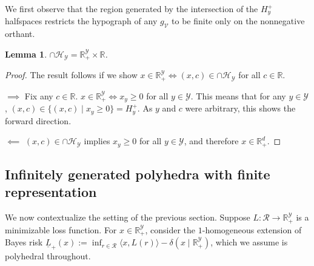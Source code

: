 \documentclass[11pt]{article}
\newcommand{\reals}{\mathbb{R}}
\renewcommand{\H}{\mathcal{H}}
\newcommand{\R}{\mathcal{R}}
\newcommand{\V}{\mathcal{V}}
\newcommand{\Y}{\mathcal{Y}}
\newcommand{\risk}[1]{\underline{#1}}
\newcommand{\inprod}[2]{\langle #1, #2 \rangle}%
\newtheorem{lemma}{Lemma}
\begin{document}
We first observe that the region generated by the intersection of the $H^+_y$ halfspaces restricts the hypograph of any $g_\V$ to be finite only on the nonnegative orthant.
\begin{lemma}\label{lem:x-nonneg-orthant-iff-intersection-HY}
  $\cap \H_\Y = \reals^\Y_+ \times \reals$.
\end{lemma}
\begin{proof}
  The result follows if we show $x \in \reals^\Y_+ \iff (x,c) \in \cap \H_\Y$ for all $c \in \reals$.

  $\implies$
  Fix any $c \in \reals$.
  $x \in \reals^\Y_+ \iff x_y \geq 0$ for all $y \in \Y$.
  This means that for any $y \in \Y$, $(x,c) \in \{(x,c) \mid x_y \geq 0\} = H^+_y$.
  As $y$ and $c$ were arbitrary, this shows the forward direction.
  
  $\impliedby$
  $(x,c) \in \cap \H_\Y$ implies $x_y \geq 0$ for all $y \in \Y$, and therefore $x \in \reals^d_+$.	
\end{proof}

\subsection{Infinitely generated polyhedra with finite representation}\label{appsubsec:phase2}

We now contextualize the setting of the previous section.
Suppose $L : \R \to \reals^\Y_+$ is a minimizable loss function.
For $x\in\reals^\Y_+$, consider the $1$-homogeneous extension of Bayes risk  $\risk{L}_+(x) := \inf_{r\in\R} \inprod{x}{L(r)} - \delta(x \mid \reals^\Y_+)$, which we assume is polyhedral throughout.
\end{document}
